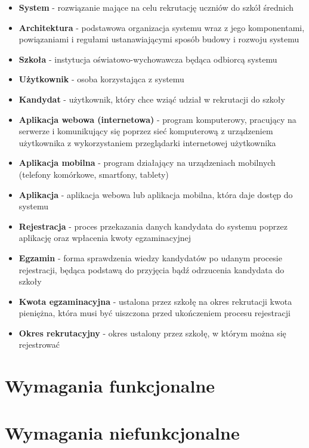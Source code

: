 \documentclass{article}
\begin{document}
\begin{itemize}
	\item \textbf{System} - rozwiązanie mające na celu rekrutację uczniów do szkół średnich
	\item \textbf{Architektura} - podstawowa organizacja systemu wraz z jego komponentami, powiązaniami i regułami ustanawiającymi sposób budowy i rozwoju systemu
	\item \textbf{Szkoła} - instytucja oświatowo-wychowawcza będąca odbiorcą systemu
	\item \textbf{Użytkownik} - osoba korzystająca z systemu
	\item \textbf{Kandydat} - użytkownik, który chce wziąć udział w rekrutacji do szkoły
	\item \textbf{Aplikacja webowa (internetowa)} - program komputerowy, pracujący na serwerze i komunikujący się poprzez sieć komputerową z urządzeniem użytkownika z wykorzystaniem przeglądarki internetowej użytkownika
	\item \textbf{Aplikacja mobilna} - program działający na urządzeniach mobilnych (telefony komórkowe, smartfony, tablety)
	\item \textbf{Aplikacja} - aplikacja webowa lub aplikacja mobilna, która daje dostęp do systemu
	\item \textbf{Rejestracja} - proces przekazania danych kandydata do systemu poprzez aplikację oraz wpłacenia kwoty egzaminacyjnej
	\item \textbf{Egzamin} - forma sprawdzenia wiedzy kandydatów po udanym procesie rejestracji, będąca podstawą do przyjęcia bądź odrzucenia kandydata do szkoły
	\item \textbf{Kwota egzaminacyjna} - ustalona przez szkołę na okres rekrutacji kwota pieniężna, która musi być uiszczona przed ukończeniem procesu rejestracji
	\item \textbf{Okres rekrutacyjny} - okres ustalony przez szkołę, w którym można się rejestrować
\end{itemize}

\section{Wymagania funkcjonalne}

\section{Wymagania niefunkcjonalne}
\end{document}
